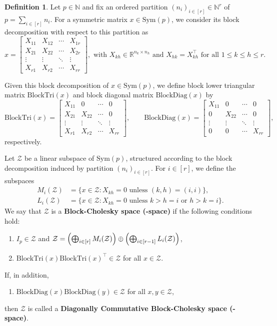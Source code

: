 \documentclass[12pt]{amsart}
\theoremstyle{plain}
\theoremstyle{definition}
\newtheorem{definition}[theorem]{Definition}
\theoremstyle{remark}
\newcommand{\N}{\mathbb{N}}
\newcommand{\1}{\mathbf{1}}
\newcommand{\bdiag}{\mathrm{BlockDiag}}
\newcommand{\tri}{\mathrm{BlockTri}}
\begin{document}
\begin{definition}\label{def:I-space}
Let $p\in\N$ and fix an ordered partition $(n_i)_{i\in[r]}\in \N^r$ of $p=\sum_{i\in[r]} n_i$. For a symmetric matrix \(x\in \mathrm{Sym}(p)\), we consider its block decomposition with respect to this partition as
\[
x =
\begin{bmatrix}
X_{11} & X_{12} & \cdots & X_{1r} \\
X_{21} & X_{22} & \cdots & X_{2r} \\
\vdots & \vdots & \ddots & \vdots \\
X_{r1} & X_{r2} & \cdots & X_{rr}
\end{bmatrix}, \,\, \mbox{with $X_{kh}\in\mathbb{R}^{n_k\times n_h}$ and $X_{hk} = X_{kh}^\top$ for all $1\le k\le h\le r$.}
\]


Given this block decomposition of $x\in \mathrm{Sym}(p)$, we define block lower triangular matrix $\tri(x)$ and block diagonal matrix $\bdiag(x)$ by
\[
\tri(x)=
\begin{bmatrix}
X_{11} & 0 & \cdots & 0 \\
X_{21} & X_{22} & \cdots & 0 \\
\vdots & \vdots & \ddots & \vdots \\
X_{r1} & X_{r2} & \cdots & X_{rr}
\end{bmatrix},\qquad 
\bdiag(x)=
\begin{bmatrix}
X_{11} & 0 & \cdots & 0 \\
0 & X_{22} & \cdots & 0 \\
\vdots & \vdots & \ddots & \vdots \\
0 & 0 & \cdots & X_{rr}
\end{bmatrix},
\]
respectively.

Let $\mathcal{Z}$ be a linear subspace of $\mathrm{Sym}(p)$, structured according to the block decomposition induced by partition $(n_i)_{i\in[r]}$. 
For $i \in[r]$, we define the subspaces
 \begin{align*}
 M_i(\mathcal{Z}) &= \{x \in \mathcal{Z}\colon X_{kh} = 0 \mbox{ unless }(k,h) = (i,i)\},\\
 L_i(\mathcal{Z}) & = \{x \in \mathcal{Z}\colon X_{kh} = 0 \mbox{ unless } k > h = i \mbox{ or } h > k = i \}.
\end{align*}
We say that $\mathcal{Z}$ is a \textbf{Block-Cholesky space (\BC-space)} if the following conditions hold:
\begin{enumerate}
\item[(Z0)] $I_p \in \mathcal{Z}$ and
$\mathcal{Z} 
= \Bigl( \bigoplus_{i\in[r]} M_i(\mathcal{Z}) \Bigr) \oplus 
  \Bigl( \bigoplus_{i\in[r-1]} L_i(\mathcal{Z}) \Bigr)$,
    \item[(Z1)] $\tri(x)\tri(x)^\top\in\mathcal{Z}$ for all $x\in \mathcal{Z}$.
\end{enumerate}
If, in addition, 
\begin{enumerate}
    \item[(Z2)] $\bdiag(x) \bdiag(y)\in\mathcal{Z}$ for all $x,y\in\mathcal{Z}$,
\end{enumerate}
then $\mathcal{Z}$ is called a \textbf{Diagonally Commutative Block-Cholesky space (\cBC-space)}.
\end{definition}
\end{document}
